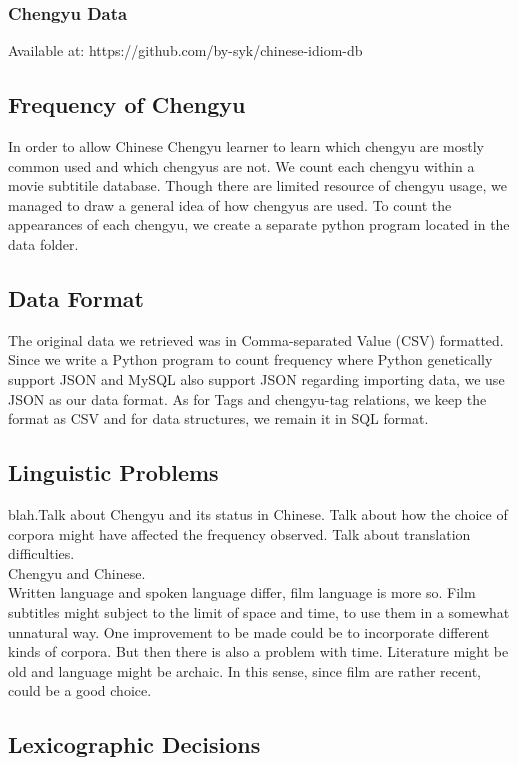 \documentclass[11pt]{article} %
\begin{document}
\subsubsection{Chengyu Data}
Available at: https://github.com/by-syk/chinese-idiom-db\\

\subsection{Frequency of Chengyu}
\indent In order to allow Chinese Chengyu learner to learn which chengyu are mostly common used and which chengyus are not. We count each chengyu within a movie subtitile database. Though there are limited resource of chengyu usage, we managed to draw a general idea of how chengyus are used. To count the appearances of each chengyu, we create a separate python program located in the data folder.

\subsection{Data Format}
\indent The original data we retrieved was in Comma-separated Value (CSV) formatted. Since we write a Python program to count frequency where Python genetically support JSON and MySQL also support JSON regarding importing data, we use JSON as our data format. As for Tags and chengyu-tag relations, we keep the format as CSV and for data structures, we remain it in SQL format.

\subsection{Linguistic Problems}

\indent blah.Talk about Chengyu and its status in Chinese. Talk about how the choice of corpora might have affected the frequency observed. Talk about translation difficulties.\\
Chengyu and Chinese.\\
Written language and spoken language differ, film language is more so. Film subtitles might subject to the limit of space and time, to use them in a somewhat unnatural way. One improvement to be made could be to incorporate different kinds of corpora. But then there is also a problem with time. Literature might be old and language might be archaic. In this sense, since film are rather recent, could be a good choice.\\

\subsection{Lexicographic Decisions}
\end{document}
